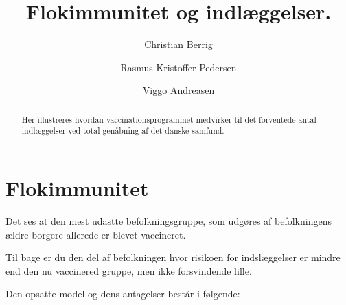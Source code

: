 \documentclass{article}
\author{Christian Berrig \and Rasmus Kristoffer Pedersen \and Viggo Andreasen}
\title{Flokimmunitet og indlæggelser.}
\begin{document}
\maketitle

\begin{abstract}
Her illustreres hvordan vaccinationsprogrammet medvirker til det forventede antal indlæggelser ved total genåbning af det danske samfund.
\end{abstract}

\section*{Flokimmunitet}

Det ses at den mest udastte befolkningsgruppe, som udgøres af befolkningens ældre borgere allerede er blevet vaccineret.

Til bage er du den del af befolkningen hvor risikoen for indslæggelser er mindre end den nu vaccinered gruppe, men ikke forsvindende lille.

Den opsatte model og dens antagelser består i følgende:
\end{document}
